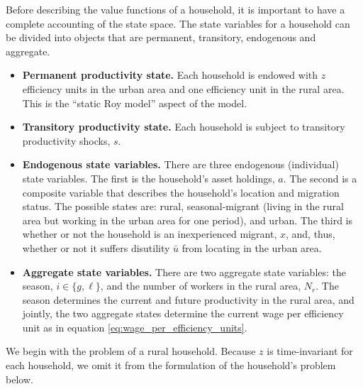 \documentclass[pdftex,11pt]{article}
\begin{document}
Before describing the value functions of a household, it is important to have a complete accounting of the state space. The state variables for a household can be divided into objects that are permanent, transitory, endogenous and aggregate.
\begin{itemize}
\item \textbf{Permanent productivity state.} Each household is endowed with $z$ efficiency units in the urban area and one efficiency unit in the rural area. This is the ``static Roy model'' aspect of the model.

\item \textbf{Transitory productivity state.} Each household is subject to transitory productivity shocks, $s$.

\item \textbf{Endogenous state variables.} There are three endogenous (individual) state variables. The first is the household's asset holdings, $a$. The second is a composite variable that describes the household's location and migration status. The possible states are: rural, seasonal-migrant (living in the rural area but working in the urban area for one period), and urban. The third is whether or not the household is an inexperienced migrant, $x$, and, thus, whether or not it suffers disutility $\bar u$ from locating in the urban area.

\item \textbf{Aggregate state variables.} There are two aggregate state variables: the season, $i \in \{g,\ell \}$, and the number of workers in the rural area, $N_r$. The season determines the current and future productivity in the rural area, and jointly, the two aggregate states determine the current wage per efficiency unit as in equation \eqref{eq:wage_per_efficiency_units}.
\end{itemize}
We begin with the problem of a rural household. Because $z$ is time-invariant for each household, we omit it from the formulation of the household's problem below.
\end{document}
